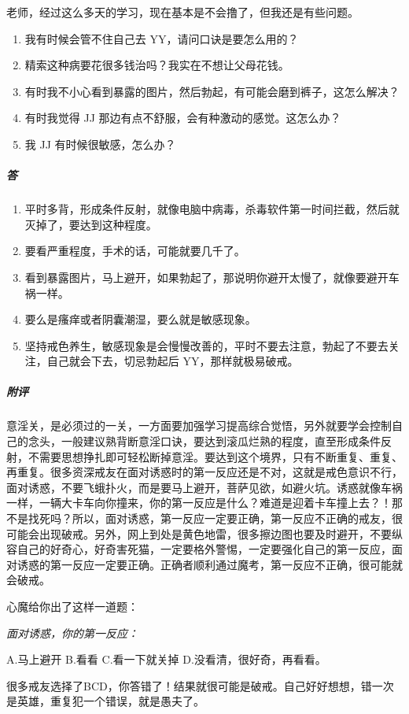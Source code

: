 \begin{case}
    老师，经过这么多天的学习，现在基本是不会撸了，但我还是有些问题。\begin{enumerate}
        \item 我有时候会管不住自己去 YY，请问口诀是要怎么用的？
        \item 精索这种病要花很多钱治吗？我实在不想让父母花钱。
        \item 有时我不小心看到暴露的图片，然后勃起，有可能会磨到裤子，这怎么解决？
        \item 有时我觉得 JJ 那边有点不舒服，会有种激动的感觉。这怎么办？
        \item 我 JJ 有时候很敏感，怎么办？
    \end{enumerate}
    \subparagraph{答} \begin{enumerate}
        \item 平时多背，形成条件反射，就像电脑中病毒，杀毒软件第一时间拦截，然后就灭掉了，要达到这种程度。
        \item 要看严重程度，手术的话，可能就要几千了。
        \item 看到暴露图片，马上避开，如果勃起了，那说明你避开太慢了，就像要避开车祸一样。
        \item 要么是瘙痒或者阴囊潮湿，要么就是敏感现象。
        \item 坚持戒色养生，敏感现象是会慢慢改善的，平时不要去注意，勃起了不要去关注，自己就会下去，切忌勃起后 YY，那样就极易破戒。
    \end{enumerate}
    \subparagraph{附评} 意淫关，是必须过的一关，一方面要加强学习提高综合觉悟，另外就要学会控制自己的念头，一般建议熟背断意淫口诀，要达到滚瓜烂熟的程度，直至形成条件反射，不需要思想挣扎即可轻松断掉意淫。要达到这个境界，只有不断重复、重复、再重复。很多资深戒友在面对诱惑时的第一反应还是不对，这就是戒色意识不行，面对诱惑，不要飞蛾扑火，而是要马上避开，菩萨见欲，如避火坑。诱惑就像车祸一样，一辆大卡车向你撞来，你的第一反应是什么？难道是迎着卡车撞上去？！那不是找死吗？所以，面对诱惑，第一反应一定要正确，第一反应不正确的戒友，很可能会出现破戒。另外，网上到处是黄色地雷，很多擦边图也要及时避开，不要纵容自己的好奇心，好奇害死猫，一定要格外警惕，一定要强化自己的第一反应，面对诱惑的第一反应一定要正确。正确者顺利通过魔考，第一反应不正确，很可能就会破戒。

    心魔给你出了这样一道题：

    \it 面对诱惑，你的第一反应：

    A.马上避开 \hfill B.看看 \hfill C.看一下就关掉 \hfill D.没看清，很好奇，再看看。\rm

    很多戒友选择了BCD，你答错了！结果就很可能是破戒。自己好好想想，错一次是英雄，重复犯一个错误，就是愚夫了。
\end{case}


